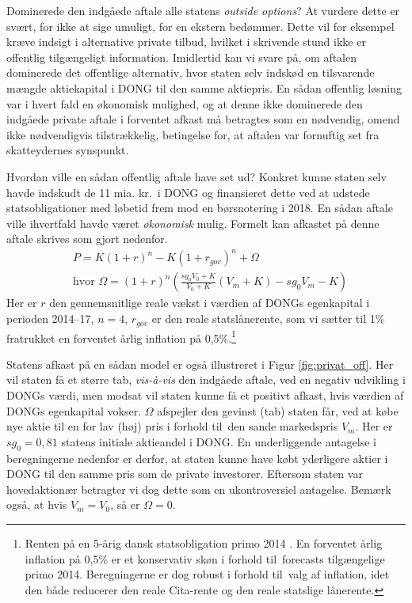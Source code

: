 \documentclass{article}
\begin{document}
Dominerede den indgåede aftale alle statens \emph{outside options}? At vurdere dette er svært, for ikke at sige umuligt, for en ekstern bedømmer. Dette vil for eksempel kræve indsigt i alternative private tilbud, hvilket i skrivende stund ikke er offentlig tilgængeligt information.
Imidlertid kan vi svare på, om aftalen dominerede det offentlige alternativ, hvor staten selv indskød en tilsvarende mængde aktiekapital i DONG til den samme aktiepris. En sådan offentlig løsning var i hvert fald en økonomisk mulighed, og at denne ikke dominerede den indgåede private aftale i forventet afkast må betragtes som en nødvendig, omend ikke nødvendigvis tilstrækkelig, betingelse for, at aftalen var fornuftig set fra skatteydernes synspunkt. 

Hvordan ville en sådan offentlig aftale have set ud? Konkret kunne staten selv havde indskudt de 11 mia. kr.\ i DONG og finansieret dette ved at udstede statsobligationer med løbetid frem mod en børsnotering i 2018. En sådan aftale ville ihvertfald havde været \emph{økonomisk} mulig. Formelt kan afkastet på denne aftale skrives som gjort nedenfor. 
\begin{align}
&P=K(1+r)^n-K(1+r_{gov})^n +\Omega \\
&\text{hvor } \Omega=(1+r)^n\left( \frac{sg_0 V_0+K}{V_0+K} \left( V_m+K \right)-sg_0 V_m -K\right)\nonumber
\label{eq:gov_capital}
\end{align}
Her er $r$ den gennemsnitlige reale vækst i værdien af DONGs egenkapital i perioden 2014--17, $n=4$, $r_{\mathit{gov}}$ er den reale statslånerente, som vi sætter til 1\% fratrukket en forventet årlig inflation på 0,5\%.\footnote{Renten på en 5-årig dansk statsobligation primo 2014 \citep{NB2014}. En forventet årlig inflation på 0,5\% er et konservativ skøn i forhold til\ forecasts tilgængelige primo 2014. Beregningerne er dog robust i forhold til\ valg af inflation, idet den både reducerer den reale Cita-rente og den reale statslige lånerente.}

Statens afkast på en sådan model er også illustreret i Figur \ref{fig:privat_off}. Her vil staten få et større tab, \emph{vis-\`{a}-vis} den indgåede aftale, ved en negativ udvikling i DONGs værdi, men modsat vil staten kunne få et positivt afkast, hvis værdien af DONGs egenkapital vokser. $\Omega$ afspejler den gevinst (tab) staten får, ved at købe nye aktie til en for lav (høj) pris i forhold til\ den sande markedspris $V_m$. Her er $sg_0=0{,}81$ statens initiale aktieandel i DONG. En underliggende antagelse i beregningerne nedenfor er derfor, at staten kunne have købt yderligere aktier i DONG til den samme pris som de private investorer. Eftersom staten var hovedaktionær betragter vi dog dette som en ukontroversiel antagelse. Bemærk også, at hvis $V_m=V_0$, så er $\Omega=0$.
\end{document}
